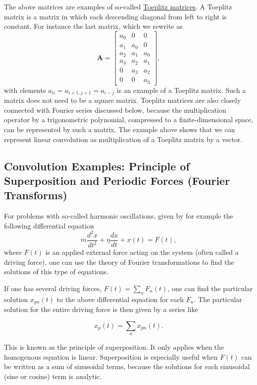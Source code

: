 \documentclass[%
oneside,                 %
final,                   %
10pt]{article}
\begin{document}
The above matrices are examples of so-called \href{{https://link.springer.com/book/10.1007/978-93-86279-04-0}}{Toeplitz
matrices}. A
Toeplitz matrix is a matrix in which each descending diagonal from
left to right is constant. For instance the last matrix, which we
rewrite as
\[
\bm{A}=\begin{bmatrix}a_0 & 0 & 0  \\
                            a_1 & a_0 & 0  \\
			    a_2 & a_1 & a_0  \\
			    a_3 & a_2 & a_1 \\
			    0 & a_3 & a_2 \\
			    0 & 0 & a_3
			    \end{bmatrix},
\]
with elements $a_{ii}=a_{i+1,j+1}=a_{i-j}$ is an example of a Toeplitz
matrix. Such a matrix does not need to be a square matrix.  Toeplitz
matrices are also closely connected with Fourier series discussed
below, because the multiplication operator by a trigonometric
polynomial, compressed to a finite-dimensional space, can be
represented by such a matrix. The example above shows that we can
represent linear convolution as multiplication of a Toeplitz matrix by
a vector.

\subsection*{Convolution Examples: Principle of Superposition and Periodic Forces (Fourier Transforms)}

For problems with so-called harmonic oscillations, given by for example the following differential equation
\[
m\frac{d^2x}{dt^2}+\eta\frac{dx}{dt}+x(t)=F(t),
\]
where $F(t)$ is an applied external force acting on the system (often
called a driving force), one can use the theory of Fourier
transformations to find the solutions of this type of equations.

If one has several driving forces, $F(t)=\sum_n F_n(t)$, one can find
the particular solution $x_{pn}(t)$ to the above differential equation for each $F_n$. The particular
solution for the entire driving force is then given by a series like

\begin{equation}
x_p(t)=\sum_nx_{pn}(t).
\end{equation}

This is known as the principle of superposition. It only applies when
the homogenous equation is linear. 
Superposition is especially useful when $F(t)$ can be written
as a sum of sinusoidal terms, because the solutions for each
sinusoidal (sine or cosine)  term is analytic. 
\end{document}
